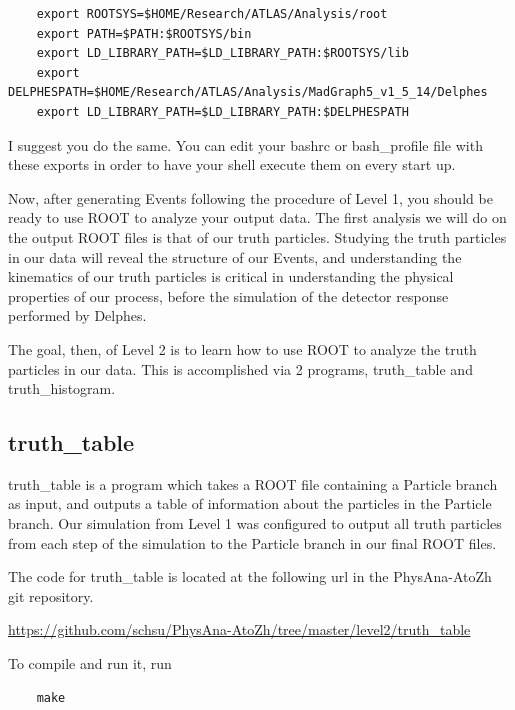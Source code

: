 \documentclass{article}
\begin{document}
\begin{verbatim}
	export ROOTSYS=$HOME/Research/ATLAS/Analysis/root
	export PATH=$PATH:$ROOTSYS/bin
	export LD_LIBRARY_PATH=$LD_LIBRARY_PATH:$ROOTSYS/lib
	export DELPHESPATH=$HOME/Research/ATLAS/Analysis/MadGraph5_v1_5_14/Delphes
	export LD_LIBRARY_PATH=$LD_LIBRARY_PATH:$DELPHESPATH
\end{verbatim}

I suggest you do the same. You can edit your bashrc or bash\_profile file with these exports in order to have your
shell execute them on every start up.

\bigskip

Now, after generating Events following the procedure of Level 1, you should be ready to use
ROOT to analyze your output data. The first analysis we will do on the output ROOT files
is that of our truth particles. Studying the truth particles in our data will reveal the
structure of our Events, and understanding the kinematics of our truth particles is critical
in understanding the physical properties of our process, before the simulation of the detector
response performed by Delphes.

\bigskip

The goal, then, of Level 2 is to learn how to use ROOT to analyze the truth particles in our
data. This is accomplished via 2 programs, truth\_table and truth\_histogram.

\subsection{truth\_table}

truth\_table is a program which takes a ROOT file containing a Particle branch
as input, and outputs a table of information about the particles in the Particle
branch. Our simulation from Level 1 was configured to output all truth particles
from each step of the simulation to the Particle branch in our final ROOT files.

\bigskip

The code for truth\_table is located at the following url in the PhysAna-AtoZh git repository.

\bigskip

\url{https://github.com/schsu/PhysAna-AtoZh/tree/master/level2/truth_table}

\bigskip

To compile and run it, run

\begin{verbatim}
	make
\end{verbatim} 
\end{document}
